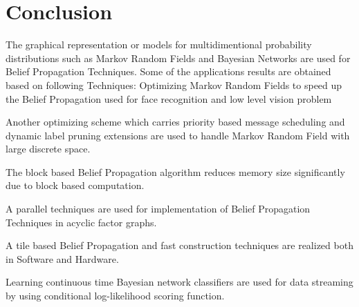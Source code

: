 \chapter{\textbf{Conclusion}}


The graphical representation or models for multidimentional probability distributions such as Markov  Random Fields and  Bayesian Networks are used for Belief Propagation Techniques.
Some of the applications results are obtained based on following Techniques:
Optimizing Markov  Random Fields to speed up the  Belief Propagation used for face recognition and low level vision problem

Another optimizing scheme which carries priority based message scheduling and dynamic label pruning extensions are used to handle  Markov  Random Field with large discrete space.

The block based Belief Propagation algorithm reduces memory size significantly due to block based computation.

A parallel techniques are used for implementation of Belief Propagation Techniques in acyclic  factor graphs.

A tile based Belief Propagation and fast construction techniques are realized both in Software and Hardware.

Learning continuous time Bayesian network classifiers are used for data streaming by using conditional log-likelihood scoring function.


